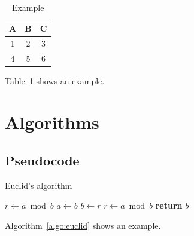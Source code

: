 \documentclass[letterpaper]{article}
\begin{document}
\begin{table}
    \centering
    \begin{tabular}{|c|c|c|}
        \hline
        A & B & C \\
        \hline
        1 & 2 & 3 \\
        4 & 5 & 6 \\
        \hline
    \end{tabular}
    \caption{Example}
    \label{tab:wide}

\end{table}

Table~\ref{tab:wide} shows an example.

\section{Algorithms}


\subsection{Pseudocode}

\begin{algorithm}
    \caption{Euclid’s algorithm}
    \label{algo:euclid}
    \begin{algorithmic}[1]
        \State $r\gets a\bmod b$
        \State $a\gets b$
        \State $b\gets r$
        \State $r\gets a\bmod b$
        \EndWhile
        \State \textbf{return} $b$
        \EndProcedure
    \end{algorithmic}
\end{algorithm}

Algorithm~\ref{algo:euclid} shows an example.
\end{document}
